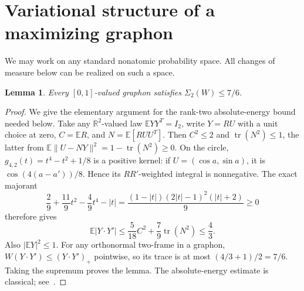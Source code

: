 \documentclass[11pt]{article}
\newtheorem{lemma}[theorem]{Lemma}
\theoremstyle{remark}\newtheorem{remark}[theorem]{Remark}
\newcommand{\E}{\mathbb E}
\newcommand{\R}{\mathbb R}
\DeclareMathOperator{\tr}{tr}
\numberwithin{equation}{section}
\begin{document}
\section{Variational structure of a maximizing graphon}\label{sec-variational}
We may work on any standard nonatomic probability space. All changes of
measure below can be realized on such a space.
\begin{lemma}\label{ranktwo}
Every $[0,1]$-valued graphon satisfies $\Sigma_2(W)\le7/6$.
\end{lemma}
\begin{proof}
We give the elementary argument for the rank-two absolute-energy
bound needed below.
Take any $\R^2$-valued law $\E YY^T=I_2$, write $Y=RU$ with a unit
choice at zero, $C=\E R$, and $N=\E[R UU^T]$.
Then $C^2\le2$ and
$\tr(N^2)\le1$, the latter from
$\E\|U-NY\|^2=1-\tr(N^2)\ge0$.
On the circle,
$g_{4,2}(t)=t^4-t^2+1/8$ is a positive kernel: if
$U=(\cos a,\sin a)$, it is $\cos(4(a-a'))/8$.
Hence its $RR'$-weighted integral is nonnegative.
The exact majorant
\[
 \frac29+\frac{11}{9}t^2-\frac49t^4-|t|
     =\frac{(1-|t|)(2|t|-1)^2(|t|+2)}9\ge0
\]
therefore gives
\[
 \E|Y\cdot Y'|\le\frac5{18}C^2+\frac79\tr(N^2)\le\frac43.
\]
Also $|\E Y|^2\le1$. For any orthonormal two-frame in a graphon,
$W(Y\cdot Y')\le(Y\cdot Y')_+$ pointwise, so its trace is at most
$(4/3+1)/2=7/6$. Taking the supremum proves the lemma.
The absolute-energy estimate is classical; see~\cite[Theorems 2 and 4]{Glazyrin}.
\end{proof}
\end{document}
